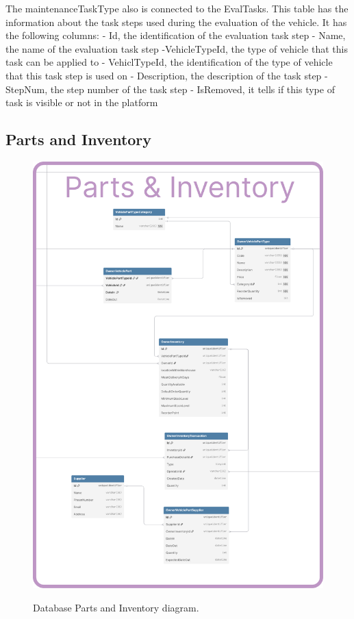 The maintenanceTaskType also is connected to the EvalTasks. This table has the information about the task steps used during the evaluation of the vehicle.
It has the following columns:
- Id, the identification of the evaluation task step
- Name, the name of the evaluation task step
-VehicleTypeId, the type of vehicle that this task can be applied to
- VehiclTypeId, the identification of the type of vehicle that this task step is used on
- Description, the description of the task step
- StepNum, the step number of the task step
- IsRemoved, it tells if this type of task is visible or not in the platform


\subsection{Parts and Inventory} 


\begin{figure}[h]
  \caption{Database Parts and Inventory diagram.}
  \centering
  \includegraphics[width=\textwidth]{figs/dbDiagrams/Parts_and_Inventory}
  \label{fig:figure2}
\end{figure}

